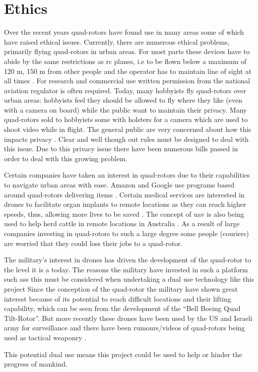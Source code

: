 \chapter{Ethics}
Over the recent years quad-rotors have found use in many areas some of which have raised ethical issues. Currently, there are numerous ethical problems, primarily flying quad-rotors in urban areas. For most parts these devices have to abide by the same restrictions as \gls{rc} planes, i.e  to be flown below a maximum of 120 m, 150 m from other people and the operator has to maintain line of sight at all times \cite{quad_fly_ireland}. For research and commercial use written permission from the national aviation regulator is often required. Today, many hobbyists fly quad-rotors over urban areas: hobbyists feel they should be allowed to fly where they like (even with a camera on board) while the public want to maintain their privacy. 
Many quad-rotors sold to hobbyists some with holsters for a camera which are used to shoot video while in flight. The general public are very concerned about how this impacts privacy \cite{Consumer_drones}. Clear and well though out rules must be designed to deal with this issue. 
Due to this privacy issue there have been numerous bills passed in order to deal with this growing problem\cite{Quadcopters_Cameras}.



Certain companies have taken an interest in quad-rotors due to their capabilities to navigate urban areas with ease. Amazon and Google use programs based around quad-rotors delivering items \cite{amazon_drones}. Certain medical services are interested in drones to facilitate organ implants to remote locations as they can reach higher speeds, thus,  allowing more lives to be saved \cite{quad_ieee_med}. The concept of \gls{uav} is also being used to help herd cattle in remote locations in Australia  \cite{herding_video}. As a result of large companies investing in quad-rotors to such a large degree some people (couriers) are worried that they could loss their jobs to a quad-rotor. 

The military's interest in drones has driven the development of the quad-rotor to the level it is a today. The reasons the military have invested in such a platform such ass this must be considered when undertaking a dual use technology like this project  Since the conception of the quad-rotor the military have shown great interest because of its potential to reach difficult locations and their lifting capability, which can be seen from the development of the  “Bell Boeing Quad Tilt-Rotor”.  But more recently these drones have been used by the US and Israeli army for surveillance and there have been rumours/videos of quad-rotors being used as tactical weaponry \cite{quad-rotor_with_Machine_Gun, Armed_Quadrotors}. 

This potential dual use  means this project could be used to help or hinder the progress of mankind.